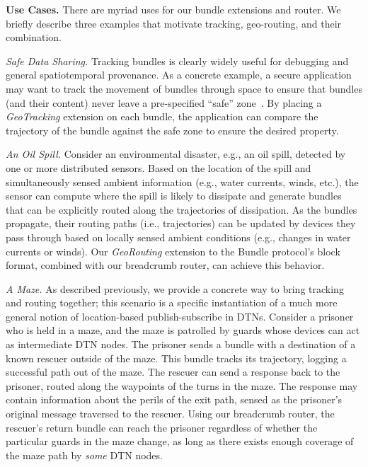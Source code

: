 %
%

{\bf Use Cases.} There are myriad uses for our bundle extensions and
router. We briefly describe three examples that motivate tracking,
geo-routing, and their combination.

{\it Safe Data Sharing.} Tracking bundles is clearly widely useful for
debugging and general spatiotemporal provenance. As a concrete
example, a secure application may want to track the movement of
bundles through space to ensure that bundles (and their content) never
leave a pre-specified ``safe'' zone~\cite{michel12:spatiotemporal}. By
placing a {\em GeoTracking} extension on each bundle, the application
can compare the trajectory of the bundle against the safe zone to
ensure the desired property.

{\it An Oil Spill.} Consider an environmental disaster, e.g., an oil
spill, detected by one or more distributed sensors. Based on the
location of the spill and simultaneously sensed ambient information
(e.g., water currents, winds, etc.), the sensor can compute where the
spill is likely to dissipate and generate bundles that can be
explicitly routed along the trajectories of dissipation. As the
bundles propagate, their routing paths (i.e., trajectories) can be
updated by devices they pass through based on locally sensed ambient
conditions (e.g., changes in water currents or winds). Our {\em
  GeoRouting} extension to the Bundle protocol's block format,
combined with our {\sc breadcrumb} router, can achieve this behavior.

{\it A Maze.} As described previously, we provide a concrete way to bring tracking and routing together; this scenario is a specific instantiation of a much more general notion of location-based publish-subscribe in DTNs. Consider a prisoner who is held in a maze, and the maze is patrolled by guards whose devices can act as intermediate DTN nodes. The prisoner sends a bundle with a destination of a known rescuer outside of the maze. This bundle tracks its trajectory, logging a successful path out of the maze. The rescuer can send a response back to the prisoner, routed along the waypoints of the turns in the maze. The response may contain information about the perils of the exit path, sensed as the prisoner's original message traversed to the rescuer. Using our {\sc breadcrumb} router, the rescuer's return bundle can reach the prisoner regardless of whether the particular guards in the maze change, as long as there exists enough coverage of the maze path by {\em some} DTN nodes.






